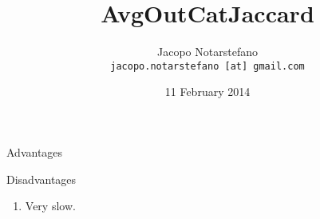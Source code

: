 \documentclass[12pt]{beamer}
\title{AvgOutCatJaccard}
\author[Jacopo Notarstefano]{
    Jacopo Notarstefano\\
    \texttt{jacopo.notarstefano [at] gmail.com}
}
\date{11 February 2014}
\begin{document}
    \begin{frame}[plain]
        \titlepage
    \end{frame}


    \begin{frame}{Advantages}
        \begin{enumerate}
        \end{enumerate}
    \end{frame}

    \begin{frame}{Disadvantages}
        \begin{enumerate}
            \item Very slow.
        \end{enumerate}
    \end{frame}
\end{document}
